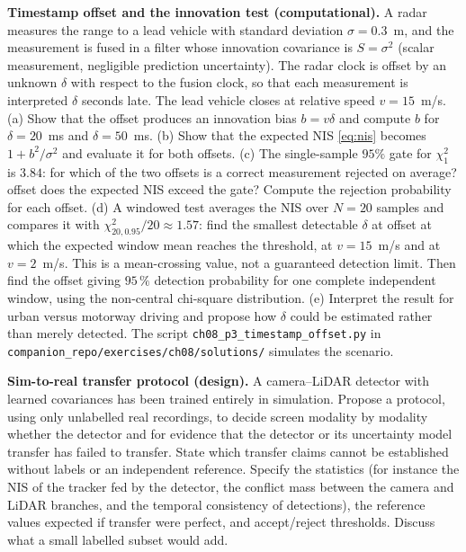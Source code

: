 \documentclass[graybox,envcountchap]{style/SNmono}
\newcommand{\repopath}[1]{\texttt{#1}}
\providecommand{\DIFadd}[1]{{\protect\color{blue} #1}} %
\providecommand{\DIFdel}[1]{{\protect\color{red} #1}} %
\providecommand{\DIFaddbegin}{} %
\providecommand{\DIFaddend}{} %
\providecommand{\DIFdelbegin}{} %
\providecommand{\DIFdelend}{} %
\begin{document}
\begin{prob}\label{prob:ch08:3}
\textbf{Timestamp offset and the innovation test (computational).} A radar measures the range to a lead vehicle with standard deviation $\sigma=0.3$~m, and the measurement is fused in a filter whose innovation covariance is $S=\sigma^2$ (scalar measurement, negligible prediction uncertainty). The radar clock is offset by an unknown $\delta$ with respect to the fusion clock, so that each measurement is interpreted $\delta$ seconds late. The lead vehicle closes at relative speed $v=15$~m/s. (a) Show that the offset produces an innovation bias $b=v\delta$ and compute $b$ for $\delta=20$~ms and $\delta=50$~ms. (b) Show that the expected NIS \eqref{eq:nis} becomes $1+b^2/\sigma^2$ and evaluate it for both offsets. (c) The single-sample $95\%$ gate for $\chi^2_1$ is $3.84$: for which \DIFdelbegin \DIFdel{of the two offsets is a correct measurement rejected on average? }\DIFdelend \DIFaddbegin \DIFadd{offset does the expected NIS exceed the gate? Compute the rejection probability for each offset. }\DIFaddend (d) A windowed test averages the NIS over $N=20$ samples and compares it with $\chi^2_{20,0.95}/20\approx1.57$: find the \DIFdelbegin \DIFdel{smallest detectable $\delta$ at }\DIFdelend \DIFaddbegin \DIFadd{offset at which the expected window mean reaches the threshold, at }\DIFaddend $v=15$~m/s and at $v=2$~m/s. \DIFaddbegin \DIFadd{This is a mean-crossing value, not a guaranteed detection limit. Then find the offset giving $95\,\%$ detection probability for one complete independent window, using the non-central chi-square distribution. }\DIFaddend (e) Interpret the result for urban versus motorway driving and propose how $\delta$ could be estimated rather than merely detected. The script \repopath{ch08\_\allowbreak p3\_\allowbreak timestamp\_\allowbreak offset.py} in \repopath{companion\_\allowbreak repo/\allowbreak exercises/\allowbreak ch08/\allowbreak solutions/\allowbreak } simulates the scenario.
\end{prob}

\begin{prob}\label{prob:ch08:4}
\textbf{Sim-to-real transfer protocol (design).} A camera--LiDAR detector with learned covariances has been trained entirely in simulation. Propose a protocol, using only unlabelled real recordings, to \DIFdelbegin \DIFdel{decide }\DIFdelend \DIFaddbegin \DIFadd{screen }\DIFaddend modality by modality \DIFdelbegin \DIFdel{whether the detector and }\DIFdelend \DIFaddbegin \DIFadd{for evidence that the detector or }\DIFaddend its uncertainty model \DIFdelbegin \DIFdel{transfer}\DIFdelend \DIFaddbegin \DIFadd{has failed to transfer. State which transfer claims cannot be established without labels or an independent reference}\DIFaddend . Specify the statistics (for instance the NIS of the tracker fed by the detector, the conflict mass between the camera and LiDAR branches, and the temporal consistency of detections), the reference values expected if transfer were perfect, and accept/reject thresholds. Discuss what a small labelled subset would add.
\end{prob}
\end{document}
